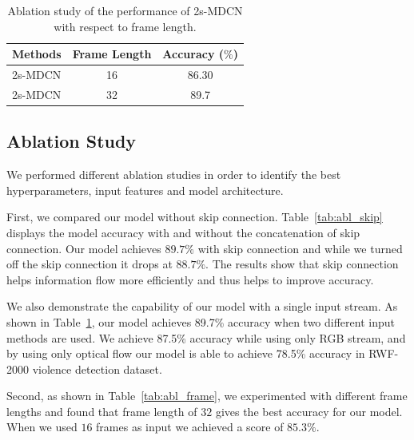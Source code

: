 	\begin{table}[htp]
    \begin{center}
		\begin{tabular}{lcc}
			\hline
			Methods     &  Frame Length  &  Accuracy ($\%$)    \\
			\hline
            2s-MDCN   &    16  &  86.30  \\
            2s-MDCN    &    32 &  89.7 \\
            \hline
		\end{tabular}
    \end{center}
	\caption{Ablation study of the performance of 2s-MDCN with respect to frame length.}
    \label{tab:abl_stream}
	\end{table}



     
    \subsection{Ablation Study}
    \label{sec:ablation}
    We performed different ablation studies in order to identify the best hyperparameters, input features and model architecture. 
    
    First, we compared our model without skip connection.  %
    Table~\ref{tab:abl_skip} displays the model accuracy with and without the concatenation of skip connection. 
    Our model achieves ${89.7\%}$ with skip connection and while we turned off the skip connection it drops at ${88.7\%}$.
    The results show that skip connection helps information flow more efficiently and thus helps to improve accuracy.
    
    We also demonstrate the capability of our model with a single input stream. As shown in Table~\ref{tab:abl_stream}, our model achieves 89.7\% accuracy when two different input methods are used. We achieve 87.5\% accuracy while using only RGB stream, and by using only optical flow our model is able to achieve 78.5\% accuracy in RWF-2000 violence detection dataset.
        
    Second, as shown in Table~\ref{tab:abl_frame}, we experimented with different frame lengths and found that frame length of $32$ gives the best accuracy for our model. 
    When we used $16$ frames as input we achieved a score of ${85.3\%}$. 
    
